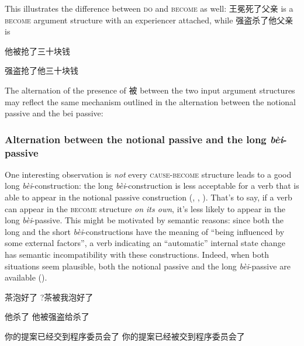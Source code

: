 \documentclass[UTF8, a4paper, oneside, scheme=plain, 12pt]{ctexrep}
\newcommand*{\term}[1]{\emph{#1}}
\newcommand{\form}[1]{\emph{#1}}
\newcommand*{\category}[1]{\textsc{#1}}
\begin{document}
This illustrates the difference between \category{do} and \category{become} as well: 
王冕死了父亲 is a \category{become} argument structure 
with an experiencer attached,
while 强盗杀了他父亲 is 

他被抢了三十块钱 

强盗抢了他三十块钱

The alternation of the presence of 被 between the two input argument structures 
may reflect the same mechanism outlined in the alternation 
between the notional passive and the bei passive:

\subsubsection{Alternation between the notional passive and the long \form{bèi}-passive}
\label{sec:verb-phrase.bei.passive-alternation}

One interesting observation is \emph{not} every \category{cause}-\category{become} structure 
leads to a good long \form{bèi}-construction: 
the long \form{bèi}-construction
is less acceptable for 
a verb that is able to appear in the notional passive construction
(,
,
).
That's to say, 
if a verb can appear in the \category{become} structure \term{on its own},
it's less likely to appear in the long \form{bèi}-passive.
This might be motivated by semantic reasons:
since both the long and the short \form{bèi}-constructions 
have the meaning of ``being influenced by some external factors'',
a verb indicating an ``automatic'' internal state change 
has semantic incompatibility with these constructions. 
Indeed, when both situations seem plausible, 
both the notional passive and the long \form{bèi}-passive 
are available ().

\begin{exe}
    \ex\label{ex:verb-phrase.bei.notional-pass-conflict-1} \begin{xlist}
        \ex 茶泡好了
        \ex ?茶被我泡好了
    \end{xlist}
    \ex\label{ex:verb-phrase.bei.notional-pass-conflict-2} \begin{xlist}
        \ex *他杀了
        \ex 他被强盗给杀了
    \end{xlist}
    \ex\label{ex:verb-phrase.bei.notional-pass-conflict-3} \begin{xlist}
        \ex 你的提案已经交到程序委员会了
        \ex 你的提案已经被交到程序委员会了
    \end{xlist}
\end{exe}
\end{document}
